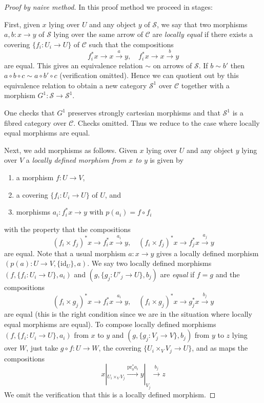 \begin{proof}[Proof by naive method]
In this proof method we proceed in stages:

\medskip\noindent
First, given $x$ lying over $U$ and any object $y$ of
$\mathcal{S}$, we say that two morphisms
$a, b : x \to y$ of $\mathcal{S}$
lying over the same arrow of $\mathcal{C}$
are {\it locally equal}
if there exists a covering $\{f_i : U_i \to U\}$ of $\mathcal{C}$
such that the compositions
$$
f_i^*x \to x \xrightarrow{a} y,
\quad
f_i^*x \to x \xrightarrow{b} y
$$
are equal. This gives an equivalence relation $\sim$
on arrows of $\mathcal{S}$. If $b \sim b'$ then
$a \circ b \circ c \sim a \circ b' \circ c$ (verification omitted).
Hence we can quotient out by this equivalence relation to
obtain a new category $\mathcal{S}^1$ over $\mathcal{C}$
together with a morphism $G^1 : \mathcal{S} \to \mathcal{S}^1$.

\medskip\noindent
One checks that $G^1$ preserves strongly cartesian morphisms
and that $\mathcal{S}^1$ is a fibred category over $\mathcal{C}$.
Checks omitted. Thus we reduce to the case where locally equal
morphisms are equal.

\medskip\noindent
Next, we add morphisms as follows. Given
$x$ lying over $U$ and any object $y$ lying over $V$
a {\it locally defined morphism from $x$ to $y$} is given by
\begin{enumerate}
\item a morphism $f : U \to V$,
\item a covering $\{f_i : U_i \to U\}$ of $U$, and
\item morphisms $a_i : f_i^*x \to y$ with $p(a_i) = f \circ f_i$
\end{enumerate}
with the property that the compositions
$$
(f_i \times f_j)^*x \to f_i^*x \xrightarrow{a_i} y,
\quad
(f_i \times f_j)^*x \to f_j^*x \xrightarrow{a_j} y
$$
are equal. Note that a usual morphism $a : x \to y$ gives a locally
defined morphism $(p(a) : U \to V, \{\text{id}_U\}, a)$.
We say two locally defined morphisms
$(f, \{f_i : U_i \to U\}, a_i)$ and $(g, \{g_j : U'_j \to U\}, b_j)$
are {\it equal} if $f = g$ and the compositions
$$
(f_i \times g_j)^*x \to f_i^*x \xrightarrow{a_i} y,
\quad
(f_i \times g_j)^*x \to g_j^*x \xrightarrow{b_j} y
$$
are equal (this is the right condition since we are in the
situation where locally equal morphisms are equal).
To compose locally defined morphisms
$(f, \{f_i : U_i \to U\}, a_i)$ from $x$ to $y$ and
$(g, \{g_j : V_j \to V\}, b_j)$ from $y$ to $z$ lying over $W$,
just take $g \circ f : U \to W$, the covering
$\{U_i \times_V V_j \to U\}$, and as maps the compositions
$$
x|_{U_i \times_V V_j}
\xrightarrow{\text{pr}_0^*a_i}
y|_{V_j}
\xrightarrow{b_j}
z
$$
We omit the verification that this is a locally defined morphism.


\end{proof}

